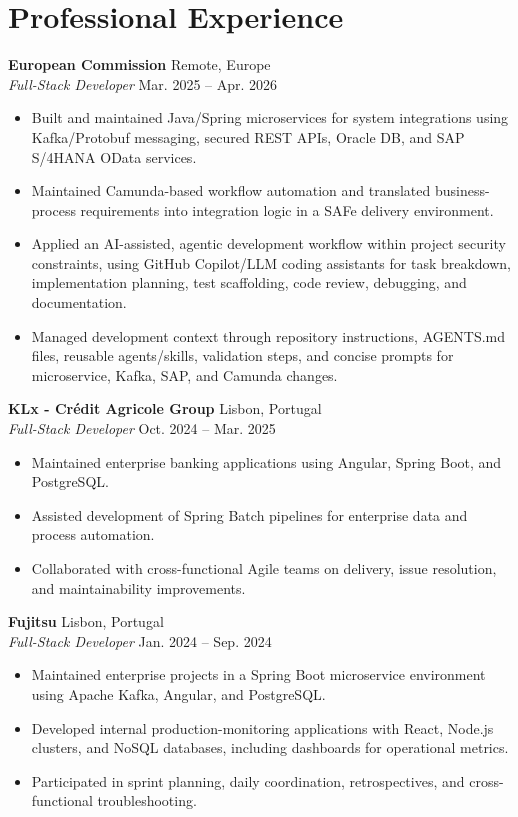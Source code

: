 \documentclass[10pt,a4paper]{article}
\newcommand{\cventry}[5]{%
  \needspace{5\baselineskip}%
  \textbf{#1} \hfill {\small\color{muted}#2}\\[-0.05em]
  {\emph{#3}} \hfill {\small\color{muted}#4}\vspace{-0.25em}
  \begin{itemize}
    #5
  \end{itemize}\vspace{0.15em}
}
\begin{document}
\section{Professional Experience}

\cventry{European Commission }{Remote, Europe}{Full-Stack Developer}{Mar. 2025 -- Apr. 2026}{
  \item Built and maintained Java/Spring microservices for system integrations using Kafka/Protobuf messaging, secured REST APIs, Oracle DB, and SAP S/4HANA OData services.
  \item Maintained Camunda-based workflow automation and translated business-process requirements into integration logic in a SAFe delivery environment.
  \item Applied an AI-assisted, agentic development workflow within project security constraints, using GitHub Copilot/LLM coding assistants for task breakdown, implementation planning, test scaffolding, code review, debugging, and documentation.
  \item Managed development context through repository instructions, AGENTS.md files, reusable agents/skills, validation steps, and concise prompts for microservice, Kafka, SAP, and Camunda changes.
}

\cventry{KLx - Crédit Agricole Group }{Lisbon, Portugal}{Full-Stack Developer}{Oct. 2024 -- Mar. 2025}{
  \item Maintained enterprise banking applications using Angular, Spring Boot, and PostgreSQL.
  \item Assisted development of Spring Batch pipelines for enterprise data and process automation.
  \item Collaborated with cross-functional Agile teams on delivery, issue resolution, and maintainability improvements.
}

\cventry{Fujitsu }{Lisbon, Portugal}{Full-Stack Developer}{Jan. 2024 -- Sep. 2024}{
  \item Maintained enterprise projects in a Spring Boot microservice environment using Apache Kafka, Angular, and PostgreSQL.
  \item Developed internal production-monitoring applications with React, Node.js clusters, and NoSQL databases, including dashboards for operational metrics.
  \item Participated in sprint planning, daily coordination, retrospectives, and cross-functional troubleshooting.
}
\end{document}
